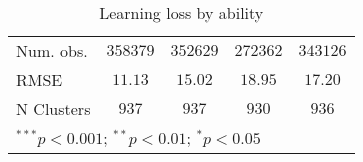 \begin{table}
\begin{center}
\begin{tabular}{l c c c c}
Num. obs.                    & $358379$      & $352629$      & $272362$      & $343126$      \\
RMSE                         & $11.13$       & $15.02$       & $18.95$       & $17.20$       \\
N Clusters                   & $937$         & $937$         & $930$         & $936$         \\
\hline
\multicolumn{5}{l}{\scriptsize{$^{***}p<0.001$; $^{**}p<0.01$; $^{*}p<0.05$}}
\end{tabular}
\caption{Learning loss by ability}
\label{tableability}
\end{center}
\end{table}
